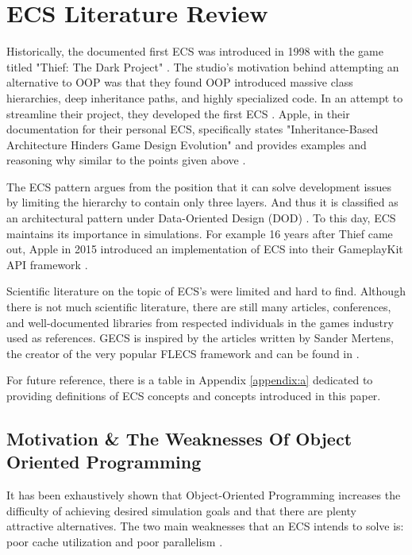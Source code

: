 \section{ECS Literature Review}
\label{chap:1}

Historically, the documented first ECS was introduced in 1998 with the game titled "Thief: The Dark Project" \cite{RomeoPHD}. The studio's motivation behind attempting an alternative to OOP was that they found OOP introduced massive class hierarchies, deep inheritance paths, and highly specialized code. In an attempt to streamline their project, they developed the first ECS \cite{Haerkoenen2019}. Apple, in their documentation for their personal ECS, specifically states "Inheritance-Based Architecture Hinders Game Design Evolution" and provides examples and reasoning why similar to the points given above \cite{AppleECSBad}.

The ECS pattern argues from the position that it can solve development issues by limiting the hierarchy to contain only three layers. And thus it is classified as an architectural pattern under Data-Oriented Design (DOD) \cite{RomeoPHD}. To this day, ECS maintains its importance in simulations. For example 16 years after Thief came out, Apple in 2015 introduced an implementation of ECS into their GameplayKit API framework \cite{AppleECS}.

Scientific literature on the topic of ECS's were limited and hard to find. Although there is not much scientific literature, there are still many articles, conferences, and well-documented libraries from respected individuals in the games industry used as references. GECS is inspired by the articles written by Sander Mertens, the creator of the very popular FLECS framework and can be found in \cite{SanderMertensECS}. 

For future reference, there is a table in Appendix \ref{appendix:a} dedicated to providing definitions of ECS concepts and concepts introduced in this paper.

\subsection{Motivation \& The Weaknesses Of Object Oriented Programming}

It has been exhaustively shown that Object-Oriented Programming increases the difficulty of achieving desired simulation goals and that there are plenty attractive alternatives. The two main weaknesses that an ECS intends to solve is: poor cache utilization and poor parallelism \cite{RomeoPHD}.

